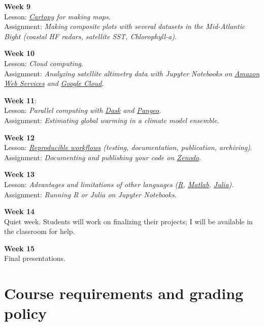 \documentclass[11pt]{article}
\begin{document}
\textbf{Week 9}\\
 Lesson: \textit{\href{https://scitools.org.uk/cartopy/docs/latest/}{Cartopy} for making maps.}\\
 Assignment: \textit{Making composite plots with several datasets in the Mid-Atlantic Bight (coastal HF radars, satellite SST, Chlorophyll-a)}.

\textbf{Week 10}\\
 Lesson: \textit{Cloud computing}.\\
 Assignment: \textit{Analyzing satellite altimetry data with Jupyter Notebooks on \href{https://aws.amazon.com}{Amazon Web Services} and \href{https://cloud.google.com}{Google Cloud}}.

 \textbf{Week 11}:\\
 Lesson:  \textit{Parallel computing with \href{https://dask.org/}{Dask} and \href{https://pangeo.io/}{Pangeo}}.\\
  Assignment: \textit{Estimating global warming in a climate model ensemble}.

\textbf{Week 12}\\
 Lesson: \textit{\href{http://www.practicereproducibleresearch.org/core-chapters/3-basic.html}{Reproducible workflows} (testing, documentation, publication, archiving)}.\\
 Assignment: \textit{Documenting and publishing your code on \href{https://zenodo.org}{Zenodo}}.

\textbf{Week 13}\\
 Lesson: \textit{Advantages and limitations of other languages (\href{https://www.r-project.org/about.html}{R}, \href{https://www.mathworks.com/products/matlab.html}{Matlab}, \href{https://julialang.org/}{Julia})}.\\
 Assignment: \textit{Running R or Julia on Jupyter Notebooks}.

\textbf{Week 14}\\
Quiet week. Students will work on finalizing their projects; I will be available  in the classroom for help.

\textbf{Week 15}\\
Final presentations.


\section*{Course requirements and grading policy}
\end{document}
